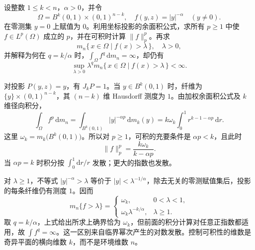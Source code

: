 \begin{exercise}\label{b1:ex:18-transverse-singularity}
设整数 \(1\le k<n\)，\(\alpha>0\)，并令
\[
 \Omega=B^k(0,1)\times(0,1)^{n-k},
 \quad f(y,z)=|y|^{-\alpha}\quad(y\ne0).
\]
在零测集 \(y=0\) 上赋值为 \(0\)。利用坐标投影的余面积公式，求所有 \(p\ge1\) 中使 \(f\in L^p(\Omega)\) 成立的 \(p\)，并在可积时计算 \(\|f\|_p^p\)。再求
\[
 m_n\{\,x\in\Omega\mid f(x)>\lambda\,\},
 \quad \lambda>0,
\]
并解释为何在 \(q=k/\alpha\) 时，\(\int_\Omega f^q\,\mathrm dm_n=\infty\)，却仍有
\[
 \sup_{\lambda>0}\lambda^q
 m_n\{\,x\in\Omega\mid f(x)>\lambda\,\}<\infty.
\]
\end{exercise}
\begin{solution}
对投影 \(P(y,z)=y\)，有 \(J_kP=1\)。当 \(y\in B^k(0,1)\) 时，纤维为 \(\{y\}\times(0,1)^{n-k}\)，其 \((n-k)\) 维 Hausdorff 测度为 \(1\)。由加权余面积公式及 \(k\) 维径向积分，
\[
 \int_\Omega f^p\,\mathrm dm_n
 =\int_{B^k(0,1)}|y|^{-\alpha p}\,\mathrm dm_k(y)
 =k\omega_k\int_0^1r^{k-1-\alpha p}\,\mathrm dr.
\]
这里 \(\omega_k=m_k\bigl(B^k(0,1)\bigr)\)。所以对 \(p\ge1\)，可积的充要条件是 \(\alpha p<k\)，且此时
\[
 \|f\|_p^p=\frac{k\omega_k}{k-\alpha p}.
\]
当 \(\alpha p=k\) 时积分按 \(\int_0^1\mathrm dr/r\) 发散；更大的指数也发散。

对 \(\lambda\ge1\)，不等式 \(|y|^{-\alpha}>\lambda\) 等价于 \(|y|<\lambda^{-1/\alpha}\)，除去无关的零测赋值集后，投影的每条纤维仍有测度 \(1\)。因而
\[
 m_n\{f>\lambda\}
 =\begin{cases}
 \omega_k,&0<\lambda<1,\\
 \omega_k\lambda^{-k/\alpha},&\lambda\ge1.
 \end{cases}
\]
取 \(q=k/\alpha\)，上式给出所求上确界恰为 \(\omega_k\)，但前面的积分计算对任意正指数都适用，故 \(\int f^q=\infty\)。这一区别来自临界幂次产生的对数发散。控制可积性的维数是奇异平面的横向维数 \(k\)，而不是环境维数 \(n\)。
\end{solution}

